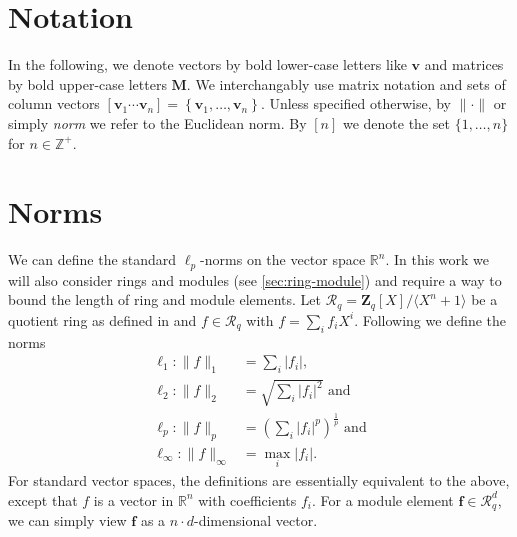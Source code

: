 


\section{Notation}
In the following, we denote vectors by bold lower-case letters like $\mathbf{v}$ and matrices by bold upper-case letters $\mathbf{M}$. We interchangably use matrix notation and sets of column vectors $\left[\mathbf{v}_1 \cdots \mathbf{v}_n\right] = \left\{\mathbf{v}_1, \dots, \mathbf{v}_n\right\}$. Unless specified otherwise, by $\| \cdot \|$ or simply \textit{norm} we refer to the Euclidean norm. By $[n]$ we denote the set $\{1, \dots, n\}$ for $n\in \mathbb{Z}^+$.

\section{Norms}\label{sec:norms}
We can define the standard $\ell_p$-norms on the vector space $\mathbb{R}^n$. In this work we will also consider rings and modules (see \cref{sec:ring-module}) and require a way to bound the length of ring and module elements. Let $\mathcal{R}_q=\mathbf{Z}_q[X]/\langle X^n + 1 \rangle$ be a quotient ring as defined in \cite{BDLOP18} and $f \in \mathcal{R}_q$ with $f = \sum_i f_i X^i$. Following \cite{BDLOP18} we define the norms
\begin{equation}
    \begin{aligned}
        \ell_1 : \| f \|_1           & = \sum_i |f_i|,                                         \\
        \ell_2 : \| f \|_2           & = \sqrt{\sum_i |f_i|^2} \text{ and}                     \\
        \ell_p : \| f \|_p           & = \left(\sum_i |f_i|^p\right)^{\frac{1}{p}} \text{ and} \\
        \ell_\infty : \| f \|_\infty & = \max_i |f_i|.
    \end{aligned}
\end{equation}
For standard vector spaces, the definitions are essentially equivalent to the above, except that $f$ is a vector in $\mathbb{R}^n$ with coefficients $f_i$. For a module element $\mathbf{f} \in \mathcal{R}_q^d$, we can simply view $\mathbf{f}$ as a $n\cdot d$-dimensional vector.

